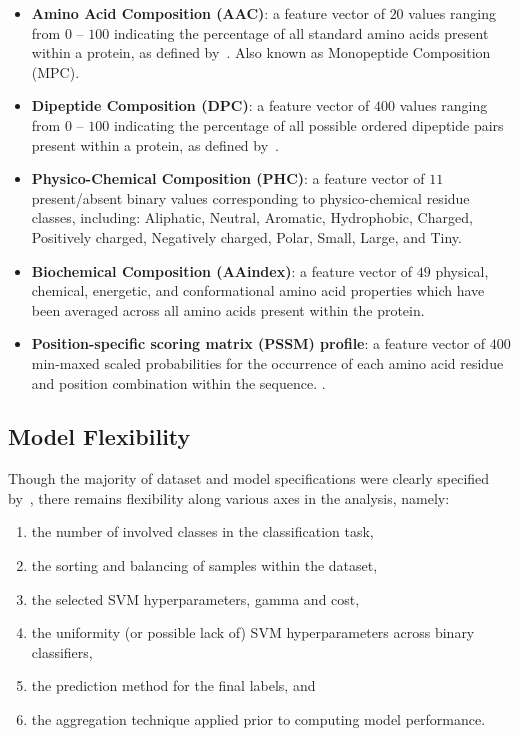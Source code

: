 \begin{itemize}
\item \textbf{Amino Acid Composition (AAC)}: a feature vector of $20$ values ranging from $0$ -- $100$ indicating the
percentage of all standard amino acids present within a protein, as defined by~\citet{gromiha2010protein}. Also known
as Monopeptide Composition (MPC).
\item \textbf{Dipeptide Composition (DPC)}: a feature vector of $400$ values ranging from $0$ -- $100$ indicating the
percentage of all possible ordered dipeptide pairs present within a protein, as defined by~\cite{gromiha2010protein}.
\item \textbf{Physico-Chemical Composition (PHC)}: a feature vector of $11$ present/absent binary values corresponding
to physico-chemical residue classes, including: Aliphatic, Neutral, Aromatic, Hydrophobic, Charged, Positively charged,
Negatively charged, Polar, Small, Large, and Tiny. 
\item \textbf{Biochemical Composition (AAindex)}: a feature vector of $49$ physical, chemical, energetic, and
conformational amino acid properties which have been averaged across all amino acids present within the protein.
\item \textbf{Position-specific scoring matrix (PSSM) profile}: a feature vector of $400$ min-maxed scaled probabilities
for the occurrence of each amino acid residue and position combination within the sequence. .
\end{itemize}

\subsection{Model Flexibility}
\label{sec:modelflex}
Though the majority of dataset and model specifications were clearly specified by~\cite{mishra2014prediction}, there
remains flexibility along various axes in the analysis, namely:

\begin{enumerate}
\item the number of involved classes in the classification task,
\item the sorting and balancing of samples within the dataset,
\item the selected SVM hyperparameters, gamma and cost,
\item the uniformity (or possible lack of) SVM hyperparameters across binary classifiers,
\item the prediction method for the final labels, and 
\item the aggregation technique applied prior to computing model performance.
\end{enumerate}

